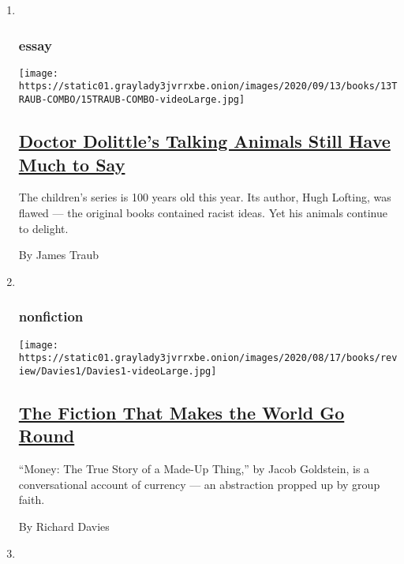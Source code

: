 \begin{enumerate}
\def\labelenumi{\arabic{enumi}.}
\item ~
  \hypertarget{essay}{%
  \subsubsection{essay}\label{essay}}

  \texttt{[image: https://static01.graylady3jvrrxbe.onion/images/2020/09/13/books/13TRAUB-COMBO/15TRAUB-COMBO-videoLarge.jpg]}

  \hypertarget{doctor-dolittles-talking-animals-still-have-much-to-say}{%
  \subsection{\texorpdfstring{\href{/2020/09/09/books/review/doctor-dolittle-hugh-lofting-talking-animals.html}{Doctor
  Dolittle's Talking Animals Still Have Much to
  Say}}{Doctor Dolittle's Talking Animals Still Have Much to Say}}\label{doctor-dolittles-talking-animals-still-have-much-to-say}}

  The children's series is 100 years old this year. Its author, Hugh
  Lofting, was flawed --- the original books contained racist ideas. Yet
  his animals continue to delight.

  By James Traub
\item ~
  \hypertarget{nonfiction-2}{%
  \subsubsection{nonfiction}\label{nonfiction-2}}

  \texttt{[image: https://static01.graylady3jvrrxbe.onion/images/2020/08/17/books/review/Davies1/Davies1-videoLarge.jpg]}

  \hypertarget{the-fiction-that-makes-the-world-go-round}{%
  \subsection{\texorpdfstring{\href{/2020/09/08/books/review/money-the-true-story-of-a-made-up-thing-jacob-goldstein.html}{The
  Fiction That Makes the World Go
  Round}}{The Fiction That Makes the World Go Round}}\label{the-fiction-that-makes-the-world-go-round}}

  ``Money: The True Story of a Made-Up Thing,'' by Jacob Goldstein, is a
  conversational account of currency --- an abstraction propped up by
  group faith.

  By Richard Davies
\item ~
  \hypertarget{fiction-1}{%
}
\end{enumerate}

